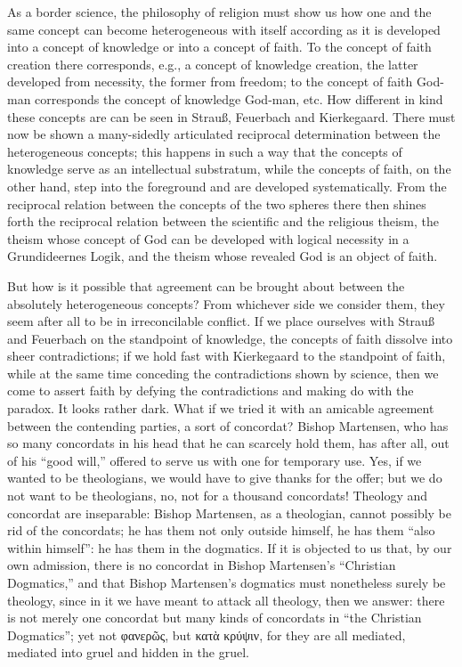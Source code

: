 \documentclass[12pt]{book}
\newcommand{\opage}[1]{\marginnote{\footnotesize\textit{[#1]}}}
\begin{document}
As a border science, the philosophy of religion must show us how one and the same concept can become heterogeneous with itself according as it is developed into a concept of knowledge or into a concept of faith. To the concept of faith creation there corresponds, e.g., a concept of knowledge creation, the latter developed from necessity, the former from freedom; to the concept of faith God-man corresponds the concept of knowledge God-man, etc. How different in kind these
\opage{138}\setcounter{footnote}{0}%
concepts are can be seen in Strauß, Feuerbach and Kierkegaard. There must now be shown a many-sidedly articulated reciprocal determination between the heterogeneous concepts; this happens in such a way that the concepts of knowledge serve as an intellectual substratum, while the concepts of faith, on the other hand, step into the foreground and are developed systematically. From the reciprocal relation between the concepts of the two spheres there then shines forth the reciprocal relation between the scientific and the religious theism, the theism whose concept of God can be developed with logical necessity in a Grundideernes Logik, and the theism whose revealed God is an object of faith.

But how is it possible that agreement can be brought about between the absolutely heterogeneous concepts? From whichever side we consider them, they seem after all to be in irreconcilable conflict. If we place ourselves with Strauß and Feuerbach on the standpoint of knowledge, the concepts of faith dissolve into sheer contradictions; if we hold fast with Kierkegaard to the standpoint of faith, while at the same time conceding the contradictions shown by science, then we come to assert faith by defying the contradictions and making do with the paradox. It looks rather dark. What if we tried it with an amicable agreement between the contending parties, a sort of concordat? Bishop Martensen, who has so many concordats in his head that he can scarcely hold them, has after all, out of his ``good will,'' offered to serve us with one for temporary use. Yes, if we wanted to be theologians, we would have to give thanks for the offer; but we do not want to be theologians, no, not for a thousand concordats! Theology and concordat are inseparable: Bishop Martensen, as a theologian, cannot possibly be rid of the concordats; he has them not only outside himself, he has them ``also within himself'': he has them in the dogmatics. If it is objected to us that, by our own admission, there is no concordat in Bishop Martensen's ``Christian Dogmatics,'' and that Bishop Martensen's dogmatics must nonetheless surely be theology, since in it we have meant to attack all theology,
\opage{139}\setcounter{footnote}{0}%
then we answer: there is not merely one concordat but many kinds of concordats in ``the Christian Dogmatics''; yet not φανερῶς, but κατὰ κρύψιν, for they are all mediated, mediated into gruel and hidden in the gruel.
\end{document}
